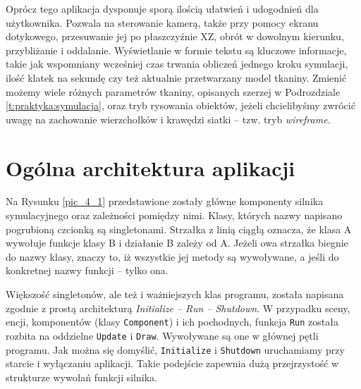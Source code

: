 	Oprócz tego aplikacja dysponuje sporą ilością ułatwień i udogodnień dla użytkownika. Pozwala na sterowanie kamerą, także przy pomocy ekranu dotykowego, przesuwanie jej po płaszczyźnie XZ, obrót w dowolnym kierunku, przybliżanie i oddalanie. Wyświetlanie w formie tekstu są kluczowe informacje, takie jak wspomniany wcześniej czas trwania obliczeń jednego kroku symulacji, ilość klatek na sekundę czy też aktualnie przetwarzany model tkaniny. Zmienić możemy wiele różnych parametrów tkaniny, opisanych szerzej w Podrozdziale \ref{t:praktyka:symulacja}, oraz tryb rysowania obiektów, jeżeli chcielibyśmy zwrócić uwagę na zachowanie wierzchołków i krawędzi siatki -- tzw. tryb \emph{wireframe}.
	
	\section{Ogólna architektura aplikacji}
	\label{t:praktyka:ogolne}
	
	
	
	Na Rysunku \ref{pic_4_1} przedstawione zostały główne komponenty silnika symulacyjnego oraz zależności pomiędzy nimi. Klasy, których nazwy napisano pogrubioną czcionką są singletonami. Strzałka z linią ciągłą oznacza, że klasa A wywołuje funkcje klasy B i działanie B zależy od A. Jeżeli owa strzałka biegnie do nazwy klasy, znaczy to, iż wszystkie jej metody są wywoływane, a jeśli do konkretnej nazwy funkcji -- tylko ona.
	
	Większość singletonów, ale też i ważniejszych klas programu, została napisana zgodnie z prostą architekturą \emph{Initialize -- Run -- Shutdown}. W przypadku sceny, encji, komponentów (klasy \texttt{Component}) i ich pochodnych, funkcja \texttt{Run} została rozbita na oddzielne \texttt{Update} i \texttt{Draw}. Wywoływane są one w głównej pętli programu. Jak można się domyślić, \texttt{Initialize} i \texttt{Shutdown} uruchamiamy przy starcie i wyłączaniu aplikacji. Takie podejście zapewnia dużą przejrzystość w strukturze wywołań funkcji silnika.
	
